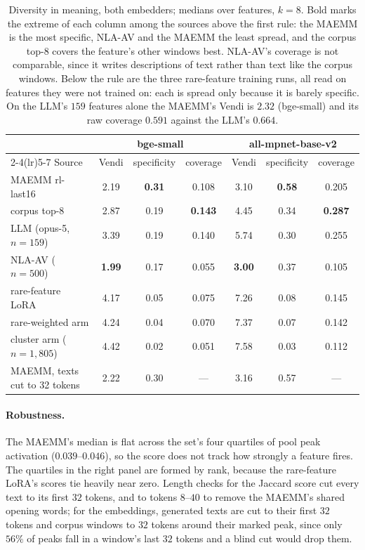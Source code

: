 \begin{table}[htbp]
\centering
\small
\begin{tabular}{lcccccc}
\toprule
& \multicolumn{3}{c}{bge-small} & \multicolumn{3}{c}{all-mpnet-base-v2} \\
\cmidrule(lr){2-4}\cmidrule(lr){5-7}
Source & Vendi & specificity & coverage & Vendi & specificity & coverage \\
\midrule
MAEMM rl-last16          & 2.19 & \textbf{0.31} & 0.108 & 3.10 & \textbf{0.58} & 0.205 \\
corpus top-8             & 2.87 & 0.19 & \textbf{0.143} & 4.45 & 0.34 & \textbf{0.287} \\
LLM (opus-5, $n=159$)    & 3.39 & 0.19 & 0.140 & 5.74 & 0.30 & 0.255 \\
NLA-AV ($n=500$)         & \textbf{1.99} & 0.17 & 0.055 & \textbf{3.00} & 0.37 & 0.105 \\
\midrule
rare-feature LoRA        & 4.17 & 0.05 & 0.075 & 7.26 & 0.08 & 0.145 \\
rare-weighted arm        & 4.24 & 0.04 & 0.070 & 7.37 & 0.07 & 0.142 \\
cluster arm ($n=1{,}805$) & 4.42 & 0.02 & 0.051 & 7.58 & 0.03 & 0.112 \\
\midrule
MAEMM, texts cut to 32 tokens & 2.22 & 0.30 & --- & 3.16 & 0.57 & --- \\
\bottomrule
\end{tabular}
\caption{Diversity in meaning, both embedders; medians over features, $k=8$. Bold marks the extreme
of each column among the sources above the first rule: the MAEMM is the most specific, NLA-AV and
the MAEMM the least spread, and the corpus top-8 covers the feature's other windows best. NLA-AV's
coverage is not comparable, since it writes descriptions of text rather than text like the corpus
windows. Below the rule are the three rare-feature training runs, all read on features they were not
trained on: each is spread only because it is barely specific. On the LLM's $159$ features alone the MAEMM's Vendi is $2.32$
(bge-small) and its raw coverage $0.591$ against the LLM's $0.664$.}
\label{tab:verb-diversity-embed}
\end{table}

\paragraph{Robustness.} The MAEMM's median is flat across the set's four quartiles of pool peak
activation ($0.039$--$0.046$), so the score does not track how strongly a feature fires. The
quartiles in the right panel are formed by rank, because the rare-feature LoRA's scores tie heavily
near zero. Length checks for the Jaccard score cut every text to its first $32$ tokens, and to
tokens $8$--$40$ to remove the MAEMM's shared opening words; for the embeddings, generated texts are
cut to their first $32$ tokens and corpus windows to $32$ tokens around their marked peak, since only
$56\%$ of peaks fall in a window's last $32$ tokens and a blind cut would drop them.

